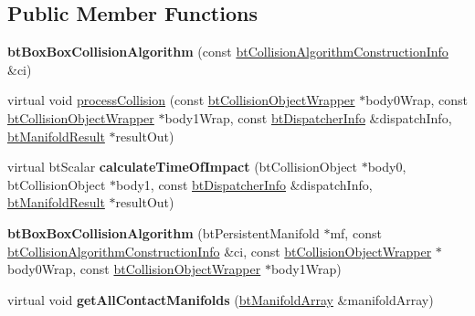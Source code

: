 \subsection*{Public Member Functions}
\begin{DoxyCompactItemize}
\item 
\hypertarget{classbt_box_box_collision_algorithm_a7e3155fbdc5ffe12264832ace89ebd39}{{\bfseries bt\+Box\+Box\+Collision\+Algorithm} (const \hyperlink{structbt_collision_algorithm_construction_info}{bt\+Collision\+Algorithm\+Construction\+Info} \&ci)}\label{classbt_box_box_collision_algorithm_a7e3155fbdc5ffe12264832ace89ebd39}

\item 
virtual void \hyperlink{classbt_box_box_collision_algorithm_aadde989098617a7679a8d907f4144adb}{process\+Collision} (const \hyperlink{structbt_collision_object_wrapper}{bt\+Collision\+Object\+Wrapper} $\ast$body0\+Wrap, const \hyperlink{structbt_collision_object_wrapper}{bt\+Collision\+Object\+Wrapper} $\ast$body1\+Wrap, const \hyperlink{structbt_dispatcher_info}{bt\+Dispatcher\+Info} \&dispatch\+Info, \hyperlink{classbt_manifold_result}{bt\+Manifold\+Result} $\ast$result\+Out)
\item 
\hypertarget{classbt_box_box_collision_algorithm_a44e93ae3a65afdf66029f66056fb7f57}{virtual bt\+Scalar {\bfseries calculate\+Time\+Of\+Impact} (bt\+Collision\+Object $\ast$body0, bt\+Collision\+Object $\ast$body1, const \hyperlink{structbt_dispatcher_info}{bt\+Dispatcher\+Info} \&dispatch\+Info, \hyperlink{classbt_manifold_result}{bt\+Manifold\+Result} $\ast$result\+Out)}\label{classbt_box_box_collision_algorithm_a44e93ae3a65afdf66029f66056fb7f57}

\item 
\hypertarget{classbt_box_box_collision_algorithm_a40dbeba5e546755c3e3bc931bf658a9e}{{\bfseries bt\+Box\+Box\+Collision\+Algorithm} (bt\+Persistent\+Manifold $\ast$mf, const \hyperlink{structbt_collision_algorithm_construction_info}{bt\+Collision\+Algorithm\+Construction\+Info} \&ci, const \hyperlink{structbt_collision_object_wrapper}{bt\+Collision\+Object\+Wrapper} $\ast$body0\+Wrap, const \hyperlink{structbt_collision_object_wrapper}{bt\+Collision\+Object\+Wrapper} $\ast$body1\+Wrap)}\label{classbt_box_box_collision_algorithm_a40dbeba5e546755c3e3bc931bf658a9e}

\item 
\hypertarget{classbt_box_box_collision_algorithm_a72753c4d2da0fcb58d24f1b3f601712d}{virtual void {\bfseries get\+All\+Contact\+Manifolds} (\hyperlink{classbt_aligned_object_array}{bt\+Manifold\+Array} \&manifold\+Array)}\label{classbt_box_box_collision_algorithm_a72753c4d2da0fcb58d24f1b3f601712d}

\end{DoxyCompactItemize}
